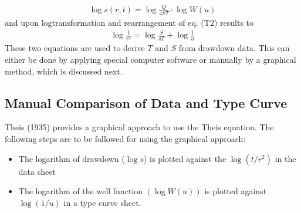 \documentclass[letterpaper,10pt,english]{jupyterBook}
\begin{document}
\begin{equation*}
\begin{split}
\log s(r,t) = \log \frac{Q}{4\pi T}\cdot \log W(u) \tag{T3}
\end{split}
\end{equation*}
\sphinxAtStartPar
and upon log\sphinxhyphen{}transformation and rearrangement of eq. (T2) results to
\begin{equation*}
\begin{split}
\log \frac{t}{r^2} = \log\frac{S}{4T} + \log\frac{1}{u} \tag{T4}
\end{split}
\end{equation*}
\sphinxAtStartPar
These two equations are used to derive \(T\) and \(S\) from drawdown data. This can either be done by applying special computer software or manually by a graphical method, which is discussed next.


\subsection{Manual Comparison of Data and Type Curve}
\label{\detokenize{content/flow/L8/18_wells:manual-comparison-of-data-and-type-curve}}
\sphinxAtStartPar
Theis (1935) provides a graphical approach to use the  Theis equation. The following steps are to be followed for using the graphical approach:
\begin{itemize}
\item {} 
\sphinxAtStartPar
The logarithm of drawdown (\(\log s\)) is plotted against the \(\log(t/r^2)\) in the data sheet

\item {} 
\sphinxAtStartPar
The logarithm of the well function \((\log W(u))\) is plotted against \(\log (1/u)\) in a type curve sheet.

\end{itemize}
\end{document}
